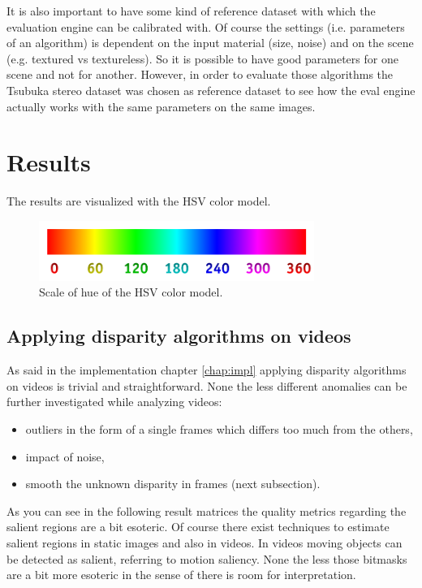 It is also important to have some kind of reference dataset with which the evaluation engine can be calibrated with.
Of course the settings (i.e. parameters of an algorithm) is dependent on the input material (size, noise) and on the scene (e.g. textured vs textureless).
So it is possible to have good parameters for one scene and not for another.
However, in order to evaluate those algorithms the Tsubuka stereo dataset was chosen as reference dataset to see how the eval engine actually works with the same parameters on the same images.

\section{Results}

The results are visualized with the HSV color model.

\begin{figure}[h!]
  \centering
  \includegraphics[width=0.8\textwidth]{src/images/hue-scale.png}
  \caption{Scale of hue of the HSV color model.}
  \label{fig:hue-scale}
\end{figure}


\subsection*{Applying disparity algorithms on videos}

As said in the implementation chapter \ref{chap:impl} applying disparity algorithms on videos is trivial and straightforward.
None the less different anomalies can be further investigated while analyzing videos:

\begin{itemize}
  \item outliers in the form of a single frames which differs too much from the others,
  \item impact of noise,
  \item smooth the unknown disparity in frames (next subsection).
\end{itemize}

\noindent As you can see in the following result matrices the quality metrics regarding the salient regions are a bit esoteric. Of course there exist techniques to estimate salient regions in static images and also in videos. In videos moving objects can be detected as salient, referring to motion saliency\citep{opencv_library, wang2014fast}. None the less those bitmasks are a bit more esoteric in the sense of there is room for interpretation.

